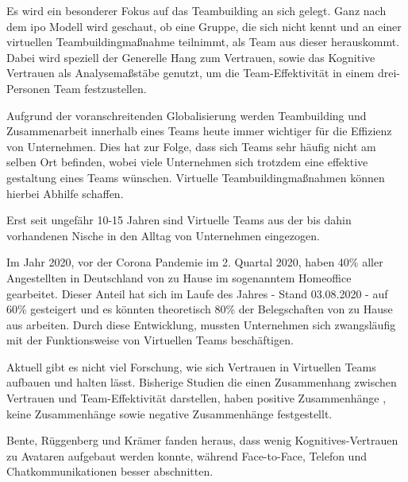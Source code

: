 \documentclass[a4paper,11pt]{article}%
\renewcommand{\\}{\vspace*{0.5\baselineskip} \newline}
\begin{document}
{	Es wird ein besonderer Fokus auf das Teambuilding an sich gelegt. Ganz nach dem \ac{ipo} Modell wird geschaut, ob eine Gruppe, die sich nicht kennt und an einer virtuellen Teambuildingmaßnahme teilnimmt, als Team aus dieser herauskommt. Dabei wird speziell der Generelle Hang zum Vertrauen, sowie das Kognitive Vertrauen als Analysemaßstäbe genutzt, um die Team-Effektivität in einem drei-Personen Team festzustellen.
	
	Aufgrund der voranschreitenden Globalisierung werden Teambuilding und Zusammenarbeit innerhalb eines Teams heute immer wichtiger für die Effizienz von Unternehmen. Dies hat zur Folge, dass sich Teams sehr häufig nicht am selben Ort befinden, wobei viele Unternehmen sich trotzdem eine effektive gestaltung eines Teams wünschen.\citep[p.791-792]{jarvenpaa1999communication} Virtuelle Teambuildingmaßnahmen können hierbei Abhilfe schaffen. 
	
Erst seit ungefähr 10-15 Jahren sind Virtuelle Teams aus der bis dahin vorhandenen Nische in den Alltag von Unternehmen eingezogen. \citep{gilson2015virtual}

Im Jahr 2020, vor der Corona Pandemie im 2. Quartal 2020, haben 40\% aller Angestellten in Deutschland von zu Hause im sogenanntem Homeoffice gearbeitet. Dieser Anteil hat sich im Laufe des Jahres - Stand 03.08.2020 - auf 60\% gesteigert und es könnten theoretisch 80\% der Belegschaften von zu Hause aus arbeiten. \citep{statistaCorona2020} Durch diese Entwicklung, mussten Unternehmen sich zwangsläufig mit der Funktionsweise von Virtuellen Teams beschäftigen.
		
	Aktuell gibt es nicht viel Forschung, wie sich Vertrauen in Virtuellen Teams aufbauen und halten lässt. \citep[p.8-23]{duarte2006mastering} 
Bisherige Studien die einen Zusammenhang zwischen Vertrauen und Team-Effektivität darstellen, haben positive Zusammenhänge \citep{davis2000trusted}, keine Zusammenhänge \citep{hertel2004managing} sowie negative Zusammenhänge \citep{dirks1999effects} festgestellt. \\

Bente, Rüggenberg und Krämer fanden heraus, dass wenig Kognitives-Vertrauen zu Avataren aufgebaut werden konnte, während Face-to-Face, Telefon und Chatkommunikationen besser abschnitten. \citep[p.54-59]{bente2004social}
	
}
\end{document}
